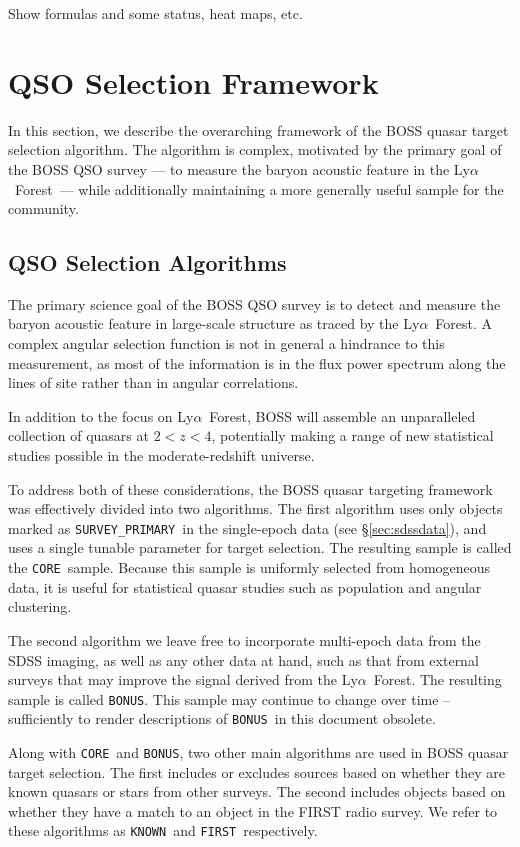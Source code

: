 \documentclass[12pt,preprint]{aastex}
\newcommand{\Lyaf}{Ly$\alpha$~Forest}
\newcommand{\core}{\texttt{CORE}}
\newcommand{\bonus}{\texttt{BONUS}}
\newcommand{\primary}{\texttt{SURVEY\_PRIMARY}}
\newcommand{\known}{\texttt{KNOWN}}
\newcommand{\first}{\texttt{FIRST}}
\begin{document}
Show formulas and some status, heat maps, etc.



\section{QSO Selection Framework} \label{sec:qsoframe}

In this section, we describe the overarching framework of the BOSS
quasar target selection algorithm. The algorithm is complex, motivated
by the primary goal of the BOSS QSO survey --- to measure the baryon
acoustic feature in the \Lyaf\ --- while additionally maintaining a more
generally useful sample for the community.

\subsection{QSO Selection Algorithms}

The primary science goal of the BOSS QSO survey is to detect and measure
the baryon acoustic feature in large-scale structure as traced by
the \Lyaf. A complex angular selection function is not in general a
hindrance to this measurement, as most of the information is in the
flux power spectrum along the lines of site rather than in angular
correlations.

In addition to the focus on \Lyaf, BOSS will assemble an unparalleled
collection of quasars at $2 < z < 4$, potentially making a range of new
statistical studies possible in the moderate-redshift universe.

To address both of these considerations, the BOSS quasar targeting
framework was effectively divided into two algorithms. The first
algorithm uses only objects marked as \primary\ in the single-epoch
data (see \S \ref{sec:sdssdata}), and uses a single tunable parameter
for target selection. The resulting sample is called the \core\ sample.
Because this sample is uniformly selected from homogeneous data, it is
useful for statistical quasar studies such as population and angular
clustering.

The second algorithm we leave free to incorporate multi-epoch data from 
the SDSS imaging, as well as any other data at hand, such as that
from external surveys that may improve the signal derived from
the \Lyaf.  The resulting sample is called \bonus.  This sample
may continue to change over time -- sufficiently to render 
descriptions of \bonus\ in this document obsolete.

Along with \core\ and \bonus, two other main algorithms are used in BOSS
quasar target selection. The first includes or excludes sources based on
whether they are known quasars or stars from other surveys. The second
includes objects based on whether they have a match to an object in the
FIRST radio survey. We refer to these algorithms as \known\ and \first\
respectively.  
\end{document}
